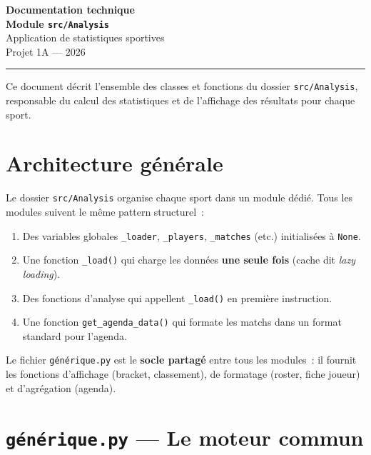 \documentclass[12pt,a4paper]{article}
\begin{document}
\begin{titlepage}
    \centering
    \vspace*{3cm}
    {\huge\bfseries Documentation technique\\[0.5em]}
    {\Large\bfseries Module \texttt{src/Analysis}\\[2em]}
    {\large Application de statistiques sportives\\[1em]}
    {\normalsize Projet 1A — 2026\\[3em]}
    \hrule
    \vspace{1em}
    {\small Ce document décrit l'ensemble des classes et fonctions du dossier
    \texttt{src/Analysis}, responsable du calcul des statistiques et de
    l'affichage des résultats pour chaque sport.}
\end{titlepage}

\tableofcontents
\newpage

\section{Architecture générale}

Le dossier \texttt{src/Analysis} organise chaque sport dans un module dédié.
Tous les modules suivent le même pattern structurel~:

\begin{enumerate}
    \item Des variables globales \texttt{\_loader}, \texttt{\_players},
    \texttt{\_matches} (etc.) initialisées à \texttt{None}.
    \item Une fonction \texttt{\_load()} qui charge les données
    \textbf{une seule fois} (cache dit \textit{lazy loading}).
    \item Des fonctions d'analyse qui appellent \texttt{\_load()} en première
    instruction.
    \item Une fonction \texttt{get\_agenda\_data()} qui formate les matchs dans
    un format standard pour l'agenda.
\end{enumerate}

Le fichier \texttt{générique.py} est le \textbf{socle partagé} entre tous
les modules~: il fournit les fonctions d'affichage (bracket, classement),
de formatage (roster, fiche joueur) et d'agrégation (agenda).

\section{\texttt{générique.py} — Le moteur commun}
\end{document}
